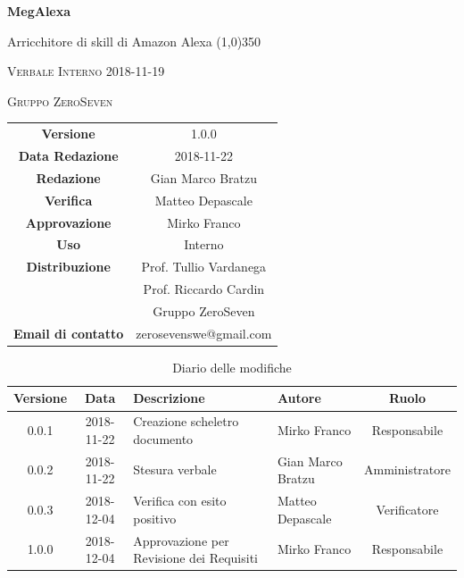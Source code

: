\documentclass[a4paper,12pt]{article}
\author{Mirko Franco}
\date{2018-11-22}
\begin{document}
\begin{titlepage}
	\centering
	{\huge\bfseries MegAlexa\par}
	Arricchitore di skill di Amazon Alexa
	\line(1,0){350} \\
	{\scshape\LARGE Verbale Interno 2018-11-19 \par}
	\vspace{1cm}
	{\scshape Gruppo ZeroSeven \par}
	\logo
	\begin{tabular}{c|c}
		{\hfill \textbf{Versione}} 			& 1.0.0				\\
		{\hfill\textbf{Data Redazione}} 	& 2018-11-22		\\ 
		{\hfill\textbf{Redazione}} 			&  		Gian Marco Bratzu			\\ 
		{\hfill\textbf{Verifica}} 				&  		Matteo Depascale		\\ 
		{\hfill\textbf{Approvazione}} 		&  		Mirko Franco	\\ 
		{\hfill\textbf{Uso}} 					& 	Interno	\\ 
		{\hfill\textbf{Distribuzione}} 			& 			Prof. Tullio Vardanega \\ & Prof. Riccardo Cardin \\ & Gruppo ZeroSeven		\\ 
		{\hfill\textbf{Email di contatto}} & zerosevenswe@gmail.com \\
	\end{tabular}
\end{titlepage}
	

	
	\label{LastFrontPage}
	

	\newpage
	\cleardoublepage
	\begin{table}[tbph]
		\centering
		\begin{tabularx}{\textwidth}{|c|c|X|X|c|}
			\hline
			\textbf{Versione} & \textbf{Data} & \textbf{Descrizione} & \textbf{Autore} & \textbf{Ruolo} \\
			\hline
			0.0.1 & 2018-11-22 & Creazione scheletro documento
			 & Mirko Franco & Responsabile\\
			\hline
			0.0.2 & 2018-11-22 & Stesura verbale & Gian Marco Bratzu & Amministratore \\
			\hline
			0.0.3 & 2018-12-04 & Verifica con esito positivo
				 & Matteo Depascale & Verificatore \\
			\hline
			1.0.0 & 2018-12-04 & 
					Approvazione per Revisione dei Requisiti
			& Mirko Franco &  Responsabile \\
			\hline
		\end{tabularx}
		\caption{Diario delle modifiche}
	\end{table}
	
\end{document}
